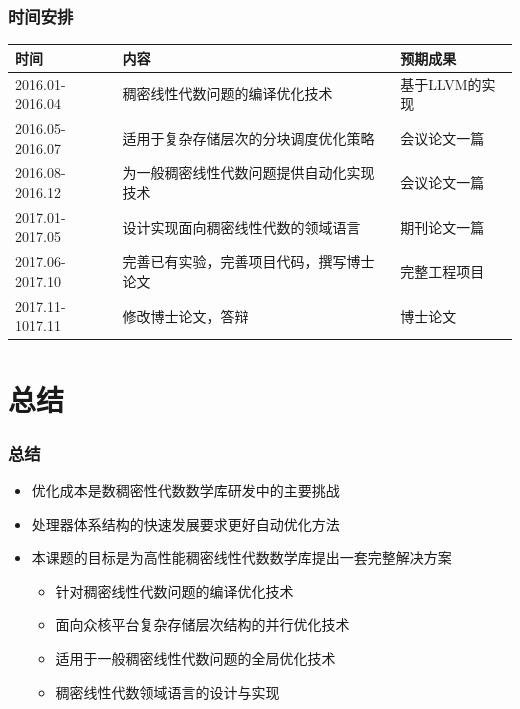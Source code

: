 \documentclass[aspectratio=169]{beamer}
\begin{document}
\begin{frame}
  \frametitle{时间安排}
  \begin{table}
    \footnotesize{
    \begin{tabular}{l|p{}|l}
      \hline
      \textbf{时间}   & \textbf{内容}                            & \textbf{预期成果} \\
      \hline
      2016.01-2016.04 & 稠密线性代数问题的编译优化技术           & 基于LLVM的实现 \\
      2016.05-2016.07 & 适用于复杂存储层次的分块调度优化策略     & 会议论文一篇 \\
      2016.08-2016.12 & 为一般稠密线性代数问题提供自动化实现技术 & 会议论文一篇 \\
      2017.01-2017.05 & 设计实现面向稠密线性代数的领域语言       & 期刊论文一篇 \\
      2017.06-2017.10 & 完善已有实验，完善项目代码，撰写博士论文 & 完整工程项目 \\
      2017.11-1017.11 & 修改博士论文，答辩                       & 博士论文 \\
      \hline
    \end{tabular}}
  \end{table}
\end{frame}

\section*{总结}

\begin{frame}
  \frametitle{总结}
  \begin{itemize}
    \item 优化成本是数稠密性代数数学库研发中的主要挑战
    \item 处理器体系结构的快速发展要求更好自动优化方法
    \item 本课题的目标是为高性能稠密线性代数数学库提出一套完整解决方案
      \begin{itemize}
      \item 针对稠密线性代数问题的编译优化技术
      \item 面向众核平台复杂存储层次结构的并行优化技术
      \item 适用于一般稠密线性代数问题的全局优化技术
      \item 稠密线性代数领域语言的设计与实现
      \end{itemize}
  \end{itemize}
\end{frame}
\end{document}
